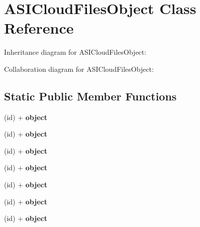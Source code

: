 \hypertarget{interface_a_s_i_cloud_files_object}{
\section{\-A\-S\-I\-Cloud\-Files\-Object \-Class \-Reference}
\label{interface_a_s_i_cloud_files_object}
}


\-Inheritance diagram for \-A\-S\-I\-Cloud\-Files\-Object\-:


\-Collaboration diagram for \-A\-S\-I\-Cloud\-Files\-Object\-:
\subsection*{\-Static \-Public \-Member \-Functions}
\begin{DoxyCompactItemize}
\item 
\hypertarget{interface_a_s_i_cloud_files_object_afd924b9fa26946c281021edcb9b9db7a}{
(id) + {\bfseries object}}
\label{interface_a_s_i_cloud_files_object_afd924b9fa26946c281021edcb9b9db7a}

\item 
\hypertarget{interface_a_s_i_cloud_files_object_afd924b9fa26946c281021edcb9b9db7a}{
(id) + {\bfseries object}}
\label{interface_a_s_i_cloud_files_object_afd924b9fa26946c281021edcb9b9db7a}

\item 
\hypertarget{interface_a_s_i_cloud_files_object_afd924b9fa26946c281021edcb9b9db7a}{
(id) + {\bfseries object}}
\label{interface_a_s_i_cloud_files_object_afd924b9fa26946c281021edcb9b9db7a}

\item 
\hypertarget{interface_a_s_i_cloud_files_object_afd924b9fa26946c281021edcb9b9db7a}{
(id) + {\bfseries object}}
\label{interface_a_s_i_cloud_files_object_afd924b9fa26946c281021edcb9b9db7a}

\item 
\hypertarget{interface_a_s_i_cloud_files_object_afd924b9fa26946c281021edcb9b9db7a}{
(id) + {\bfseries object}}
\label{interface_a_s_i_cloud_files_object_afd924b9fa26946c281021edcb9b9db7a}

\item 
\hypertarget{interface_a_s_i_cloud_files_object_afd924b9fa26946c281021edcb9b9db7a}{
(id) + {\bfseries object}}
\label{interface_a_s_i_cloud_files_object_afd924b9fa26946c281021edcb9b9db7a}

\item 
\hypertarget{interface_a_s_i_cloud_files_object_afd924b9fa26946c281021edcb9b9db7a}{
(id) + {\bfseries object}}
\label{interface_a_s_i_cloud_files_object_afd924b9fa26946c281021edcb9b9db7a}


\end{DoxyCompactItemize}
